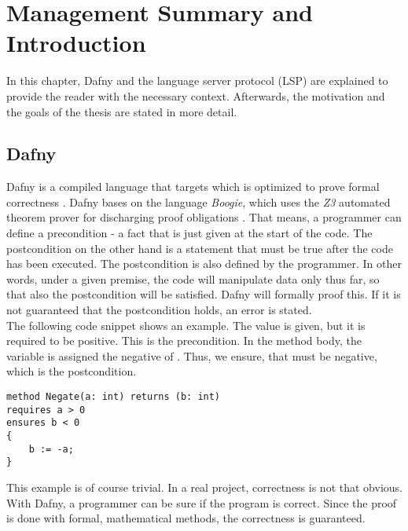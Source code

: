 \section{Management Summary and Introduction}
\label{section:introduction}
In this chapter, Dafny and the language server protocol (LSP) are explained to provide the reader with the necessary context.
Afterwards, the motivation and the goals of the thesis are stated in more detail.

\subsection{Dafny}
\label{section:introduction:dafny}
Dafny is a compiled language that targets \Csharp which is optimized to prove formal correctness \cite{dafnyWiki}.
Dafny bases on the language \textit{Boogie}, which uses the \textit{Z3} automated theorem prover for discharging proof obligations \cite{dafnyWiki}.
That means, a programmer can define a precondition - a fact that is just given at the start of the code.
The postcondition on the other hand is a statement that must be true after the code has been executed.
The postcondition is also defined by the programmer.
In other words, under a given premise, the code will manipulate data only thus far, so that also the postcondition will be satisfied.
Dafny will formally proof this.
If it is not guaranteed that the postcondition holds, an error is stated.\\

The following code snippet shows an example.
The value  is given, but it is required to be positive.
This is the precondition.
In the method body, the variable  is assigned the negative of .
Thus, we ensure, that  must be negative, which is the postcondition.
\begin{lstlisting}[language=dafny, caption={Simple Dafny Example}, captionpos=b, label={lst:simpleDafnyExample}]
method Negate(a: int) returns (b: int)
requires a > 0
ensures b < 0
{
    b := -a;
}
\end{lstlisting}
This example is of course trivial.
In a real project, correctness is not that obvious.
With Dafny, a programmer can be sure if the program is correct.
Since the proof is done with formal, mathematical methods, the correctness is guaranteed.\\

